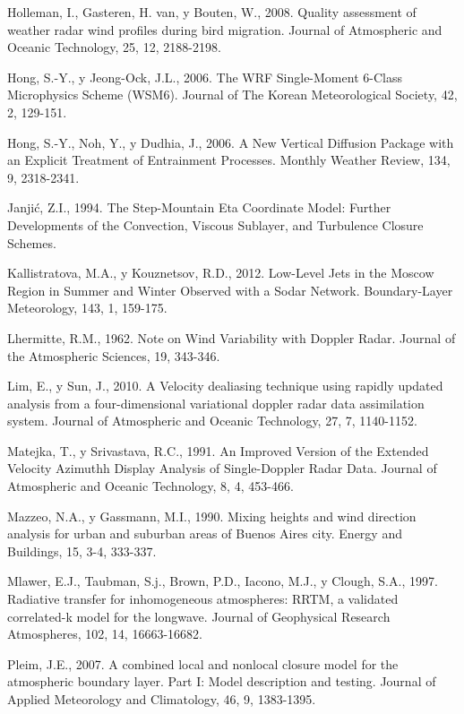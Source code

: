 \documentclass[12pt,spanish,oneside]{book}
\begin{document}
\hypertarget{ref-Holleman2008}{}
Holleman, I., Gasteren, H. van, y Bouten, W., 2008. Quality assessment
of weather radar wind profiles during bird migration. Journal of
Atmospheric and Oceanic Technology, 25, 12, 2188-2198.

\hypertarget{ref-Hong2006a}{}
Hong, S.-Y., y Jeong-Ock, J.L., 2006. The WRF Single-Moment 6-Class
Microphysics Scheme (WSM6). Journal of The Korean Meteorological
Society, 42, 2, 129-151.

\hypertarget{ref-Hong2006}{}
Hong, S.-Y., Noh, Y., y Dudhia, J., 2006. A New Vertical Diffusion
Package with an Explicit Treatment of Entrainment Processes. Monthly
Weather Review, 134, 9, 2318-2341.

\hypertarget{ref-Janjic1994}{}
Janjić, Z.I., 1994. The Step-Mountain Eta Coordinate Model: Further
Developments of the Convection, Viscous Sublayer, and Turbulence Closure
Schemes.

\hypertarget{ref-Kallistratova2012}{}
Kallistratova, M.A., y Kouznetsov, R.D., 2012. Low-Level Jets in the
Moscow Region in Summer and Winter Observed with a Sodar Network.
Boundary-Layer Meteorology, 143, 1, 159-175.

\hypertarget{ref-Lhermitte1962}{}
Lhermitte, R.M., 1962. Note on Wind Variability with Doppler Radar.
Journal of the Atmospheric Sciences, 19, 343-346.

\hypertarget{ref-Lim2010}{}
Lim, E., y Sun, J., 2010. A Velocity dealiasing technique using rapidly
updated analysis from a four-dimensional variational doppler radar data
assimilation system. Journal of Atmospheric and Oceanic Technology, 27,
7, 1140-1152.

\hypertarget{ref-Matejka1991}{}
Matejka, T., y Srivastava, R.C., 1991. An Improved Version of the
Extended Velocity Azimuthh Display Analysis of Single-Doppler Radar
Data. Journal of Atmospheric and Oceanic Technology, 8, 4, 453-466.

\hypertarget{ref-Mazzeo1990}{}
Mazzeo, N.A., y Gassmann, M.I., 1990. Mixing heights and wind direction
analysis for urban and suburban areas of Buenos Aires city. Energy and
Buildings, 15, 3-4, 333-337.

\hypertarget{ref-Mlawer1997}{}
Mlawer, E.J., Taubman, S.j., Brown, P.D., Iacono, M.J., y Clough, S.A.,
1997. Radiative transfer for inhomogeneous atmospheres: RRTM, a
validated correlated-k model for the longwave. Journal of Geophysical
Research Atmospheres, 102, 14, 16663-16682.

\hypertarget{ref-Pleim2007}{}
Pleim, J.E., 2007. A combined local and nonlocal closure model for the
atmospheric boundary layer. Part I: Model description and testing.
Journal of Applied Meteorology and Climatology, 46, 9, 1383-1395.
\end{document}
